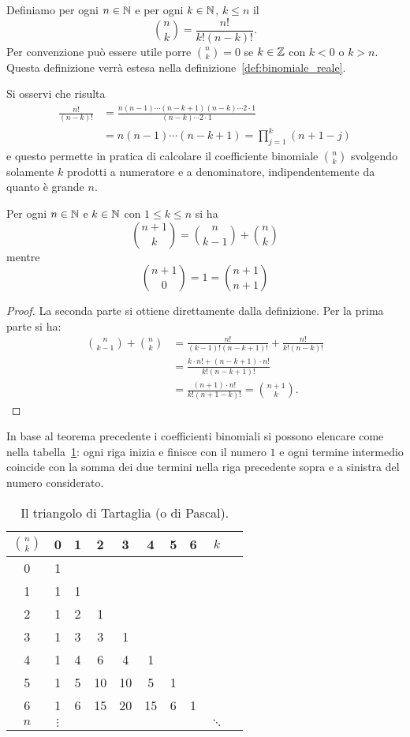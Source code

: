 \begin{definition}
\label{def:binomiale}
\mymark{***}
Definiamo per ogni $n\in \mathbb N$ e per ogni $k\in \mathbb N$, $k\le n$
il 
\[
{n \choose k}
=\frac{n!}{k!(n-k)!}.
\]
Per convenzione può essere utile porre
${n \choose k}=0$ se $k\in \mathbb Z$ con $k< 0$ o $k>n$.
Questa definizione verrà estesa nella definizione~\ref{def:binomiale_reale}.
\end{definition}
%
Si osservi che risulta
\begin{align*}
\frac{n!}{(n-k)!} &= \frac{n (n-1) \cdots (n-k+1)(n-k) \cdots 2\cdot 1}{(n-k) \cdots 2\cdot 1}\\
 &= n (n-1) \cdots (n-k+1) = \prod_{j=1}^k (n+1-j)
\end{align*}
e questo permette in pratica di calcolare il coefficiente binomiale ${n \choose k}$
svolgendo solamente $k$ prodotti a numeratore e a denominatore, indipendentemente
da quanto è grande $n$.

\begin{theorem}
\mymark{*}
Per ogni $n\in \mathbb N$ e $k \in \mathbb N$ con $1 \le k \le n$ si ha
\[
  {n+1 \choose k} =
      {n \choose k-1} + {n \choose k}
\]
mentre
\[
  {n+1 \choose 0} = 1 = {n+1 \choose n+1}
\]
\end{theorem}
%
\begin{proof}
La seconda parte si ottiene direttamente dalla definizione.
Per la prima parte si ha:
\begin{align*}
{n \choose k-1} + {n \choose k}
&= \frac{n!}{(k-1)!(n-k+1)!} + \frac{n!}{k!(n-k)!} \\
&= \frac{k\cdot n! + (n-k+1)\cdot n!}{k!(n-k+1)!} \\
&= \frac{(n+1)\cdot n!}{k!(n+1-k)!}
= {n+1 \choose k}.
\end{align*}
\end{proof}

In base al teorema precedente i coefficienti binomiali si possono
elencare come nella tabella~\ref{tab:binomiali}:
ogni riga inizia e finisce con il numero $1$
e ogni termine intermedio coincide con la somma dei
due termini nella riga precedente sopra e
a sinistra del numero considerato.

\begin{table}
\begin{tabular}{c|ccccccccc}
$\displaystyle{n \choose k}$& 0 & 1 & 2 & 3 & 4 & 5 & 6 & $k$ &\\ \hline
  0 & 1 &   &   &   &   &   &   & &\\
  1 & 1 & 1 &   &   &   &   &   & &\\
  2 & 1 & 2 & 1 &   &   &   &   & &\\
  3 & 1 & 3 & 3 & 1 &   &   &   & &\\
  4 & 1 & 4 & 6 & 4 & 1 &   &   & &\\
  5 & 1 & 5 & 10& 10& 5 & 1 &   & &\\
  6 & 1 & 6 & 15& 20& 15& 6 & 1 & &\\
$n$ &$\vdots$&&   &   &   &   &   & $\ddots$ &
\end{tabular}
\caption{Il triangolo di Tartaglia (o di Pascal).}
\label{tab:binomiali}
\end{table}

